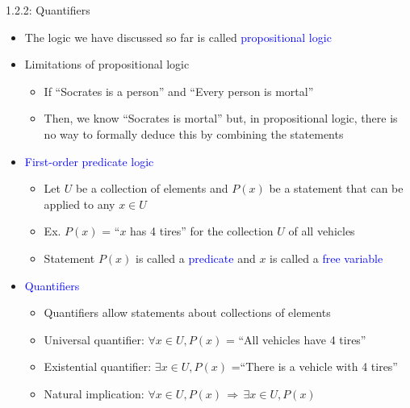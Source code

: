 \documentclass[10pt,english]{beamer}
\begin{document}
\begin{frame}{1.2.2: Quantifiers}

\begin{itemize}
\setlength\itemsep{3mm}
\item<1-> The logic we have discussed so far is called \textcolor{blue}{propositional logic}

\item<1-> Limitations of propositional logic \vspace{1mm}
\begin{itemize}
 \setlength\itemsep{1.5mm}
 \item If ``Socrates is a person'' and ``Every person is mortal''
 \item Then, we know ``Socrates is mortal'' but, in propositional logic, there is no way to formally deduce this by combining the statements 
\end{itemize}

\item<2-> \textcolor{blue}{First-order predicate logic} \vspace{1mm}
\begin{itemize}
 \setlength\itemsep{1.5mm}
 \item Let $U$ be a collection of elements and $P(x)$ be a statement that can be applied to any $x\in U$
 \item Ex. $P(x)$ = ``$x$ has 4 tires'' for the collection $U$ of all vehicles
 \item Statement $P(x)$ is called a \textcolor{blue}{predicate} and $x$ is called a \textcolor{blue}{free variable}
\end{itemize}

\item<3-> \textcolor{blue}{Quantifiers}
\begin{itemize}
 \setlength\itemsep{1.5mm}
 \item Quantifiers allow statements about collections of elements
 \item Universal quantifier: $\forall x\!\in\! U, P(x)$ = ``All vehicles have 4 tires''
 \item Existential quantifier: $\exists x\!\in\! U, P(x)$ =``There is a vehicle with 4 tires''
 \item Natural implication: $\forall x \!\in\!U, P(x) \,\Rightarrow\, \exists x\!\in\! U, P(x)$
\end{itemize}



\end{itemize}

\end{frame}
\end{document}
